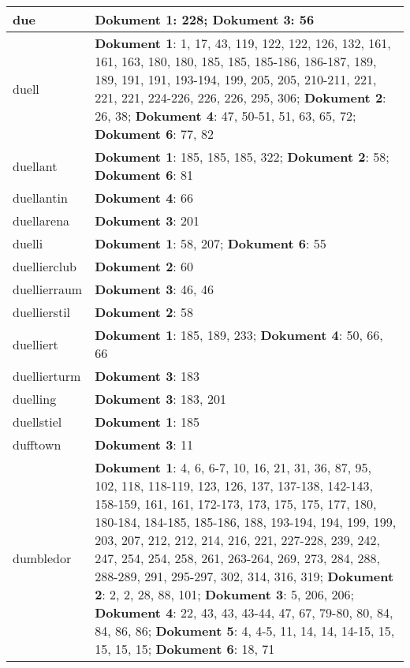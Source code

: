 \documentclass[a5paper]{article}
\begin{document}
\begin{longtable}[l]{|l|p{3in}|}
\hline
due & \textbf{Dokument 1}: 228; \textbf{Dokument 3}: 56 \\
\hline
duell & \textbf{Dokument 1}: 1, 17, 43, 119, 122, 122, 126, 132, 161, 161, 163, 180, 180, 185, 185, 185-186, 186-187, 189, 189, 191, 191, 193-194, 199, 205, 205, 210-211, 221, 221, 221, 224-226, 226, 226, 295, 306; \textbf{Dokument 2}: 26, 38; \textbf{Dokument 4}: 47, 50-51, 51, 63, 65, 72; \textbf{Dokument 6}: 77, 82 \\
\hline
duellant & \textbf{Dokument 1}: 185, 185, 185, 322; \textbf{Dokument 2}: 58; \textbf{Dokument 6}: 81 \\
\hline
duellantin & \textbf{Dokument 4}: 66 \\
\hline
duellarena & \textbf{Dokument 3}: 201 \\
\hline
duelli & \textbf{Dokument 1}: 58, 207; \textbf{Dokument 6}: 55 \\
\hline
duellierclub & \textbf{Dokument 2}: 60 \\
\hline
duellierraum & \textbf{Dokument 3}: 46, 46 \\
\hline
duellierstil & \textbf{Dokument 2}: 58 \\
\hline
duelliert & \textbf{Dokument 1}: 185, 189, 233; \textbf{Dokument 4}: 50, 66, 66 \\
\hline
duellierturm & \textbf{Dokument 3}: 183 \\
\hline
duelling & \textbf{Dokument 3}: 183, 201 \\
\hline
duellstiel & \textbf{Dokument 1}: 185 \\
\hline
dufftown & \textbf{Dokument 3}: 11 \\
\hline
dumbledor & \textbf{Dokument 1}: 4, 6, 6-7, 10, 16, 21, 31, 36, 87, 95, 102, 118, 118-119, 123, 126, 137, 137-138, 142-143, 158-159, 161, 161, 172-173, 173, 175, 175, 177, 180, 180-184, 184-185, 185-186, 188, 193-194, 194, 199, 199, 203, 207, 212, 212, 214, 216, 221, 227-228, 239, 242, 247, 254, 254, 258, 261, 263-264, 269, 273, 284, 288, 288-289, 291, 295-297, 302, 314, 316, 319; \textbf{Dokument 2}: 2, 2, 28, 88, 101; \textbf{Dokument 3}: 5, 206, 206; \textbf{Dokument 4}: 22, 43, 43, 43-44, 47, 67, 79-80, 80, 84, 84, 86, 86; \textbf{Dokument 5}: 4, 4-5, 11, 14, 14, 14-15, 15, 15, 15, 15; \textbf{Dokument 6}: 18, 71 \\
\hline

\end{longtable}
\end{document}
